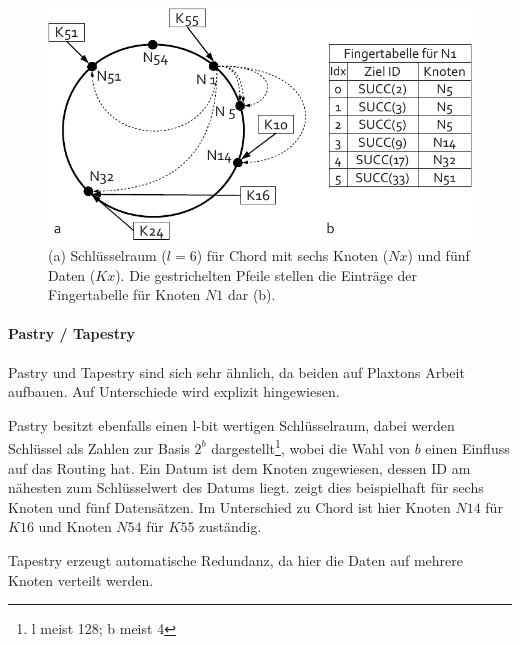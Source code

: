 \begin{figure}[htb]
\centering
\includegraphics{grafics/chord_key_space.pdf}
\caption{(a) Schlüsselraum ($l=6$) für Chord mit sechs Knoten ($Nx$) und fünf Daten ($Kx$). Die gestrichelten Pfeile stellen die Einträge der Fingertabelle für Knoten $N1$ dar (b).}
\label{fig:chord_key_space}
\end{figure}


\paragraph{Pastry / Tapestry}
Pastry \cite{Rowstron2001} und Tapestry \cite{Zhao2001Tapestry,Zhao2004Tapestry} sind sich sehr ähnlich, da beiden auf Plaxtons Arbeit \cite{Plaxton1997Accessing} aufbauen. Auf Unterschiede wird explizit hingewiesen.

Pastry besitzt ebenfalls einen l-bit wertigen Schlüsselraum, dabei werden Schlüssel als Zahlen zur Basis $2^b$ dargestellt\footnote{l meist 128; b meist 4}, wobei die Wahl von $b$ einen Einfluss auf das Routing hat. Ein Datum ist dem Knoten zugewiesen, dessen ID am nähesten zum Schlüsselwert des Datums liegt.   zeigt dies beispielhaft für sechs Knoten und fünf Datensätzen. Im Unterschied zu Chord ist hier Knoten $N14$ für $K16$ und Knoten $N54$ für $K55$ zuständig.\\

Tapestry erzeugt automatische Redundanz, da hier die Daten auf mehrere Knoten verteilt werden.

